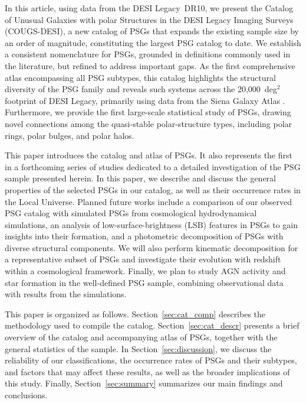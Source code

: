 \documentclass{aa}
\begin{document}
In this article, using data from the DESI Legacy~DR10, we present the Catalog of Unusual Galaxies with polar Structures in the DESI Legacy Imaging Surveys (COUGS-DESI), a new catalog of PSGs that expands the existing sample size by an order of magnitude, constituting the largest PSG catalog to date. We establish a consistent nomenclature for PSGs, grounded in definitions commonly used in the literature, but refined to address important gaps. As the first comprehensive atlas encompassing all PSG subtypes, this catalog highlights the structural diversity of the PSG family and reveals such systems across the 20,000~deg$^{2}$ footprint of DESI Legacy, primarily using data from the Siena Galaxy Atlas \citep{2023ApJS..269....3M}. Furthermore, we provide the first large-scale statistical study of PSGs, drawing novel connections among the quasi-stable polar-structure types, including polar rings, polar bulges, and polar halos.

This paper introduces the catalog and atlas of PSGs. It also represents the first in a forthcoming series of studies dedicated to a detailed investigation of the PSG sample presented herein. In this paper, we describe and discuss the general properties of the selected PSGs in our catalog, as well as their occurrence rates in the Local Universe. Planned future works include a comparison of our observed PSG catalog with simulated PSGs from cosmological hydrodynamical simulations, an analysis of low-surface-brightness (LSB) features in PSGs to gain insights into their formation, and a photometric decomposition of PSGs with diverse structural components. We will also perform kinematic decomposition for a representative subset of PSGs and investigate their evolution with redshift within a cosmological framework. Finally, we plan to study AGN activity and star formation in the well-defined PSG sample, combining observational data with results from the simulations.

This paper is organized as follows. Section~\ref{sec:cat_comp} describes the methodology used to compile the catalog. Section~\ref{sec:cat_descr} presents a brief overview of the catalog and accompanying atlas of PSGs, together with the general statistics of the sample. In Section~\ref{sec:discussion}, we discuss the reliability of our classifications, the occurrence rates of PSGs and their subtypes, and factors that may affect these results, as well as the broader implications of this study. Finally, Section~\ref{sec:summary} summarizes our main findings and conclusions.
\end{document}
